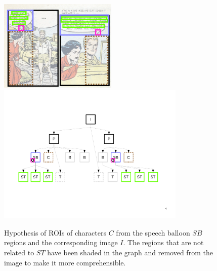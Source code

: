 
 \begin{figure}[!ht]  %
   \centering
   \includegraphics[trim= 0px 0px 0px 0px, clip, width=0.5\textwidth]{process_illustration_hypo_2_1.png}\\
  \includegraphics[trim= 30px 168px 20px 110px, clip, width=0.8\textwidth]{graph_init_2_1.pdf}
  \caption[Hypothesis of ROIs of characters $C$ from the speech balloon $SB$ regions and the corresponding image $I$]{Hypothesis of ROIs of characters $C$ from the speech balloon $SB$ regions and the corresponding image $I$. The regions that are not related to $ST$ have been shaded in the graph and removed from the image to make it more comprehensible.
  }
  \label{fig:kn:hypothesis_roi}
 \end{figure}


